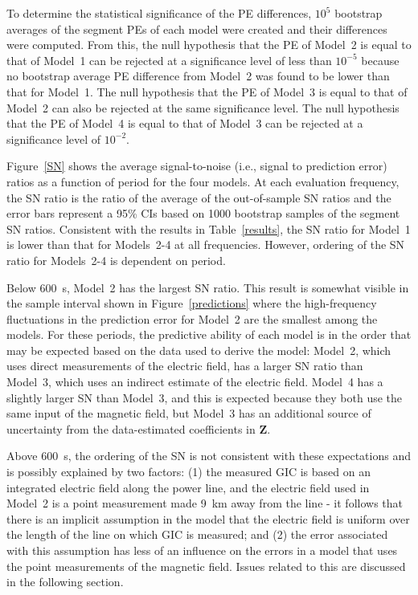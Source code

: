 \documentclass[draft,linenumbers]{agujournal2018}
\begin{document}
To determine the statistical significance of the PE differences, $10^5$ bootstrap averages of the segment PEs of each model were created and their differences were computed. From this, the null hypothesis that the PE of Model~2 is equal to that of Model~1 can be rejected at a significance level of less than $10^{-5}$ because no bootstrap average PE difference from Model~2 was found to be lower than that for Model~1. The null hypothesis that the PE of Model~3 is equal to that of Model~2 can also be rejected at the same significance level. The null hypothesis that the PE of Model~4 is equal to that of Model~3 can be rejected at a significance level of $10^{-2}$.

Figure~\ref{SN} shows the average signal-to-noise (i.e., signal to prediction error) ratios as a function of period for the four models. At each evaluation frequency, the SN ratio is the ratio of the average of the out-of-sample SN ratios and the error bars represent a 95\% CIs based on 1000 bootstrap samples of the segment SN ratios. Consistent with the results in Table~\ref{results}, the SN ratio for Model~1 is lower than that for Models~2-4 at all frequencies. However, ordering of the SN ratio for Models~2-4 is dependent on period. 

Below $600$~s, Model~2 has the largest SN ratio. This result is somewhat visible in the sample interval shown in Figure~\ref{predictions} where the high-frequency fluctuations in the prediction error for Model~2 are the smallest among the models. For these periods, the predictive ability of each model is in the order that may be expected based on the data used to derive the model: Model~2, which uses direct measurements of the electric field, has a larger SN ratio than Model~3, which uses an indirect estimate of the electric field. Model~4 has a slightly larger SN than Model~3, and this is expected because they both use the same input of the magnetic field, but Model~3 has an additional source of uncertainty from the data-estimated coefficients in $\mathbf{Z}$.

Above $600$~s, the ordering of the SN is not consistent with these expectations and is possibly explained by two factors: (1) the measured GIC is based on an integrated electric field along the power line, and the electric field used in Model~2 is a point measurement made 9~km away from the line - it follows that there is an implicit assumption in the model that the electric field is uniform over the length of the line on which GIC is measured; and (2) the error associated with this assumption has less of an influence on the errors in a model that uses the point measurements of the magnetic field. Issues related to this are discussed in the following section.
\end{document}
